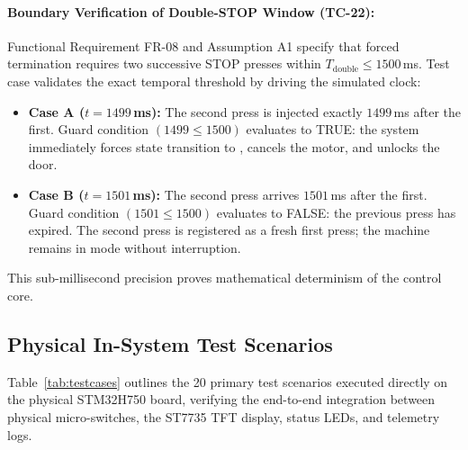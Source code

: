 \paragraph{Boundary Verification of Double-STOP Window (TC-22):}
Functional Requirement FR-08 and Assumption A1 specify that forced termination requires two successive STOP presses within $T_{\text{double}} \le 1500$\,ms. Test case  validates the exact temporal threshold by driving the simulated clock:
\begin{itemize}
  \item \textbf{Case A ($t = 1499$\,ms):} The second press is injected exactly $1499$\,ms after the first. Guard condition $(1499 \le 1500)$ evaluates to TRUE: the system immediately forces state transition to , cancels the motor, and unlocks the door.
  \item \textbf{Case B ($t = 1501$\,ms):} The second press arrives $1501$\,ms after the first. Guard condition $(1501 \le 1500)$ evaluates to FALSE: the previous press has expired. The second press is registered as a fresh first press; the machine remains in  mode without interruption.
\end{itemize}
This sub-millisecond precision proves mathematical determinism of the control core.

\subsection{Physical In-System Test Scenarios}

Table~\ref{tab:testcases} outlines the 20 primary test scenarios executed directly on the physical STM32H750 board, verifying the end-to-end integration between physical micro-switches, the ST7735 TFT display, status LEDs, and telemetry logs.

